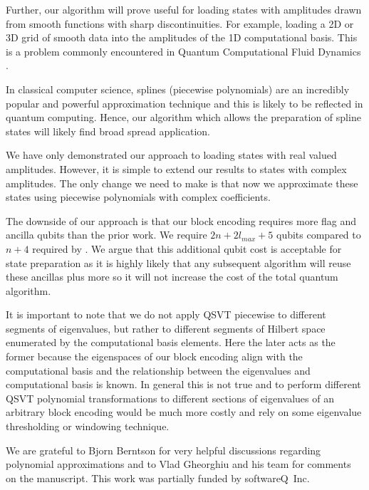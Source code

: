 \documentclass[aps,prx,twocolumn,floatfix,10pt,amssymb,amsfont,amsmath,superscriptaddress,float,nofootinbib,longbibliography,nobalancelastpage]{revtex4-2}
\theoremstyle{empty}
\begin{document}
Further, our algorithm will prove useful for loading states with amplitudes drawn from smooth functions with sharp discontinuities. For example, loading a 2D or 3D grid of smooth data into the amplitudes of the 1D computational basis. This is a problem commonly encountered in Quantum Computational Fluid Dynamics \cite{Lapworth:2022rcw}.

In classical computer science, splines (piecewise polynomials) are an incredibly popular and powerful approximation technique and this is likely to be reflected in quantum computing. Hence, our algorithm which allows the preparation of spline states will likely find broad spread application.

We have only demonstrated our approach to loading states with real valued amplitudes. However, it is simple to extend our results to states with complex amplitudes. The only change we need to make is that now we approximate these states using piecewise polynomials with complex coefficients. 

The downside of our approach is that our block encoding requires more flag and ancilla qubits than the prior work. We require $2n +2l_{max} +5$ qubits compared to $n+4$ required by \cite{mcardleQuantumStatePreparation2022}. We argue that this additional qubit cost is acceptable for state preparation as it is highly likely that any subsequent algorithm will reuse these ancillas plus more so it will not increase the cost of the total quantum algorithm.

It is important to note that we do not apply QSVT piecewise to different segments of eigenvalues, but rather to different segments of Hilbert space enumerated by the computational basis elements. Here the later acts as the former because the eigenspaces of our block encoding align with the computational basis and the relationship between the eigenvalues and computational basis is known. In general this is not true and to perform different QSVT polynomial transformations to different sections of eigenvalues of an arbitrary block encoding would be much more costly and rely on some eigenvalue thresholding or windowing technique.
\onecolumngrid
\begin{acknowledgments}
We are grateful to Bjorn Berntson for very helpful discussions regarding polynomial approximations and to Vlad Gheorghiu and his team for comments on the manuscript. This work was partially funded by softwareQ~Inc.
\end{acknowledgments}
\twocolumngrid

\appendix
\end{document}
